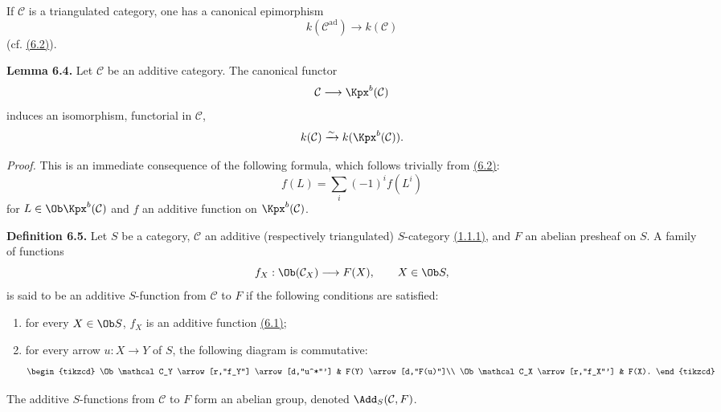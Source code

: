 If \(\mathcal C\) is a triangulated category, one has a canonical epimorphism
\[
  k(\mathcal C^{\mathrm{ad}})\longrightarrow k(\mathcal C)
\]
(cf. \hyperlink{sga6.e01.para.6-2}{(6.2)}).

\textbf{Lemma 6.4.} Let \(\mathcal C\) be an additive category. The canonical functor
\[
  \mathcal C\longrightarrow \Kpx^b(\mathcal C)
\]
induces an isomorphism, functorial in \(\mathcal C\),
\[
  k(\mathcal C)\xrightarrow{\sim} k(\Kpx^b(\mathcal C)).
\]

\emph{Proof.} This is an immediate consequence of the following formula, which follows trivially from \hyperlink{sga6.e01.para.6-2}{(6.2)}:
\begin{equation}\tag{6.4.1}
  f(L)=\sum_i (-1)^i f(L^i)
\end{equation}
for \(L\in\Ob\Kpx^b(\mathcal C)\) and \(f\) an additive function on \(\Kpx^b(\mathcal C)\).

\textbf{Definition 6.5.} Let \(S\) be a category, \(\mathcal C\) an additive (respectively triangulated) \(S\)-category \hyperlink{sga6.e01.para.1-1-1}{(1.1.1)}, and \(F\) an abelian presheaf on \(S\). A family of functions
\[
  f_X:\Ob(\mathcal C_X)\longrightarrow F(X),
  \qquad X\in\Ob S,
\]
is said to be an additive \(S\)-function from \(\mathcal C\) to \(F\) if the following conditions are satisfied:
\begin{enumerate}[label=(\roman*)]
\item for every \(X\in\Ob S\), \(f_X\) is an additive function \hyperlink{sga6.e01.def.6-1}{(6.1)};
\item for every arrow \(u:X\to Y\) of \(S\), the following diagram is commutative:
\[
\begin{tikzcd}
\Ob\mathcal C_Y \arrow[r,"f_Y"] \arrow[d,"u^*"'] & F(Y) \arrow[d,"F(u)"]\\
\Ob\mathcal C_X \arrow[r,"f_X"'] & F(X).
\end{tikzcd}
\]
\end{enumerate}
The additive \(S\)-functions from \(\mathcal C\) to \(F\) form an abelian group, denoted \(\Add_S(\mathcal C,F)\).

